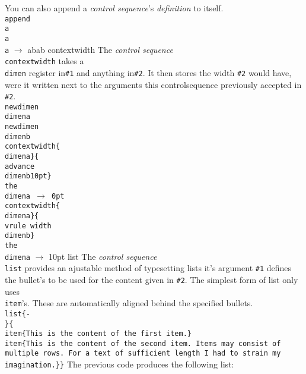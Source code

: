 You can also append a {\it control sequence}'s {\it definition} to itself.\hfil\break
{\tt\\append\\a\\a\hfil\break
\\a} $\rightarrow$ abab
\medskip
\noindent contextwidth
\smallskip
The {\it control sequence} {\tt\\contextwidth} takes a {\tt\\dimen} register in{\tt\#1} and anything in{\tt\#2}. It then stores the width {\tt\#2} would have, were it written next to the arguments this controlsequence previously accepted in {\tt\#2}.\hfil\break
{\tt\\newdimen\\dimena\hfil\break
\\newdimen\\dimenb\hfil\break
\\contextwidth\{\\dimena\}\{\\advance\\dimenb10pt\}\hfil\break
\\the\\dimena\hbox{ $\rightarrow$ 0pt}\hfil\break
\\contextwidth\{\\dimena\}\{\\vrule width\\dimenb\}\hfil\break
\\the\\dimena} $\rightarrow$ 10pt
\bigskip
\noindent list
\smallskip
The {\it control sequence} {\tt\\list} provides an ajustable method of typesetting lists it's argument {\tt\#1} defines the bullet's to be used for the content given in {\tt\#2}. The simplest form of list only uses {\tt\\item}'s. These are automatically aligned behind the specified bullets.
{\tt\\list\{-\\ \}\{\hfil\break
\\item\{This is the content of the first item.\}\hfil\break
\\item\{This is the content of the second item.\hfil\break
Items may consist of multiple rows.\hfil\break
For a text of sufficient length I had to strain my imagination.\}\}\hfil\break}
The previous code produces the following list:\hfil\break
{}
